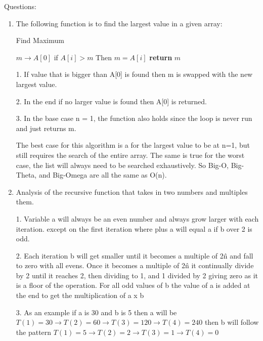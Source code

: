 Questions: 
\begin{enumerate}
 \item 
The following function is to find the largest value in a given array:

\begin{algorithm}[H]
\caption{Find Maximum}
\label{alg:euclid}
\begin{algorithmic}[1] 
    \State $m \rightarrow A[0]$
     
        \State if $A[i] > m$
        \State Then $m = A[i]$
    \EndWhile\label{euclidendwhile}
    \State \textbf{return} $m$
    \EndProcedure
\end{algorithmic}
\end{algorithm}

1. If value that is bigger than A[0] is found then m is swapped with the new largest value. 

2. In the end if no larger value is found then A[0] is returned.

3. In the base case n = 1, the function also holds since the loop is never run and just returns m. 

The best case for this algorithm is a for the largest value to be at n=1, but still requires the search of the entire array. The same is true for the worst case, the list will always need to be searched exhaustively. So Big-O, Big-Theta, and Big-Omega are all the same as O(n).
 
 
 
 \item Analysis of the recursive function that takes in two numbers and multiples them.
 
 1. Variable a will always be an even number and always grow larger with each iteration. except on the first iteration where plus a will equal a if b over 2 is odd.
 
 2. Each iteration b will get smaller until it becomes a multiple of 2\^n and fall to zero with all evens. Once it becomes a multiple of 2\^n it continually divide by 2 until it reaches 2, then dividing to 1, and 1 divided by 2 giving zero as it is a floor of the operation. For all odd values of b the value of a is added at the end to get the multiplication of a x b
 
 3. As an example if a is 30 and b is 5 then a will be $T(1)=30 \rightarrow T(2)=60 \rightarrow T(3)=120 \rightarrow T(4)=240 $ then b will follow the pattern $ T(1)=5 \rightarrow T(2)=2 \rightarrow T(3)=1 \rightarrow T(4)=0 $
 

\end{enumerate}
